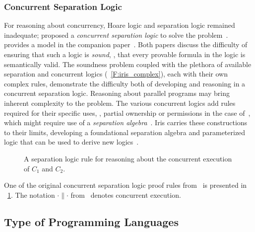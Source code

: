 \subsubsection{Concurrent Separation Logic}

For reasoning about concurrency, Hoare logic and separation logic remained
inadequate; \citeauthor{O_Hearn_2007} proposed a \emph{concurrent separation
logic} to solve the problem~\cite{O_Hearn_2007}. \citeauthor{Brookes_2007}
provides a model in the companion paper~\cite{Brookes_2007}. Both papers discuss
the difficulty of ensuring that such a logic is \emph{sound}, \ie, that every
provable formula in the logic is semantically valid. The soundness problem
coupled with the plethora of available separation and concurrent logics
(\figurename~\ref{F:iris_complex}), each with their own complex rules,
demonstrate the difficulty both of developing and reasoning in a concurrent
separation logic. Reasoning about parallel programs may bring inherent
complexity to the problem. The various concurrent logics add rules required for
their specific uses, \eg, partial ownership or permissions in the case
of~\cite{Appel_2011}, which might require use of a \emph{separation
algebra}~\cite{Jung_2016,Krebbers_2017a}. Iris carries these constructions to
their limits, developing a foundational separation algebra and parameterized
logic that can be used to derive new logics~\cite{Jung_2018b}.

\begin{figure}[ht]
    \centering
    \caption{A separation logic rule for reasoning about the concurrent
    execution of \(C_1\) and \(C_2\).}\label{F:CSL_ex}
\end{figure}

One of the original concurrent separation logic proof rules
from~\cite{O_Hearn_2007} is presented in \figurename~\ref{F:CSL_ex}. The
notation \(\cdot \parallel \cdot\) from~\cite{O_Hearn_2007} denotes concurrent
execution.

\subsection{Type of Programming Languages}\label{S:t_pl}

